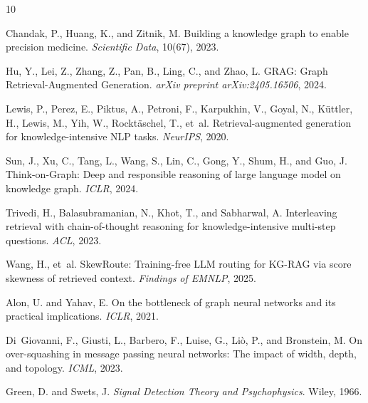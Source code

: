 \documentclass[11pt]{article}
\begin{document}

\begin{thebibliography}{10}

Chandak, P., Huang, K., and Zitnik, M.
\newblock Building a knowledge graph to enable precision medicine.
\newblock \textit{Scientific Data}, 10(67), 2023.

Hu, Y., Lei, Z., Zhang, Z., Pan, B., Ling, C., and Zhao, L.
\newblock GRAG: Graph Retrieval-Augmented Generation.
\newblock \textit{arXiv preprint arXiv:2405.16506}, 2024.

Lewis, P., Perez, E., Piktus, A., Petroni, F., Karpukhin, V., Goyal, N., K{\"u}ttler, H., Lewis, M., Yih, W., Rockt{\"a}schel, T., et~al.
\newblock Retrieval-augmented generation for knowledge-intensive NLP tasks.
\newblock \textit{NeurIPS}, 2020.

Sun, J., Xu, C., Tang, L., Wang, S., Lin, C., Gong, Y., Shum, H., and Guo, J.
\newblock Think-on-Graph: Deep and responsible reasoning of large language model on knowledge graph.
\newblock \textit{ICLR}, 2024.

Trivedi, H., Balasubramanian, N., Khot, T., and Sabharwal, A.
\newblock Interleaving retrieval with chain-of-thought reasoning for knowledge-intensive multi-step questions.
\newblock \textit{ACL}, 2023.

Wang, H., et~al.
\newblock SkewRoute: Training-free LLM routing for KG-RAG via score skewness of retrieved context.
\newblock \textit{Findings of EMNLP}, 2025.

Alon, U. and Yahav, E.
\newblock On the bottleneck of graph neural networks and its practical implications.
\newblock \textit{ICLR}, 2021.

Di~Giovanni, F., Giusti, L., Barbero, F., Luise, G., Li\`{o}, P., and Bronstein, M.
\newblock On over-squashing in message passing neural networks: The impact of width, depth, and topology.
\newblock \textit{ICML}, 2023.

Green, D. and Swets, J.
\newblock \textit{Signal Detection Theory and Psychophysics}.
\newblock Wiley, 1966.


\end{thebibliography}
\end{document}
